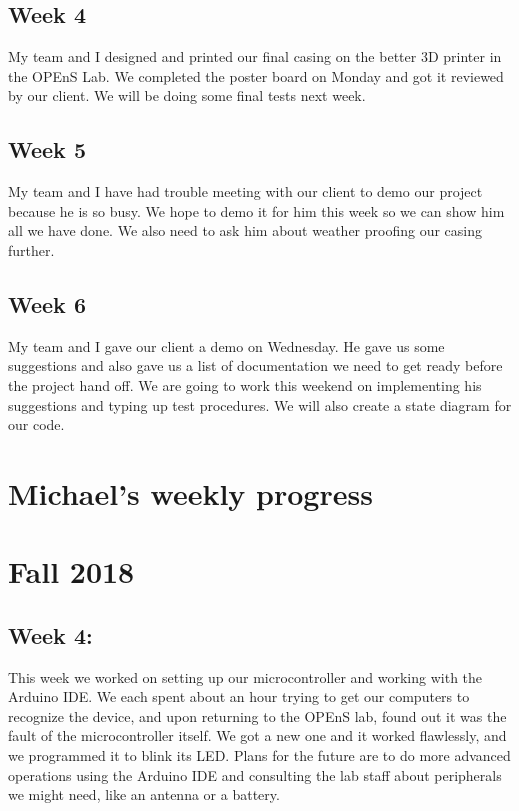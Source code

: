 \documentclass[letterpaper,10pt,draftclsnofoot,onecolumn]{article}
\begin{document}
\subsection{Week 4}

My team and I designed and printed our final casing on the better 3D printer in the OPEnS Lab. We completed the poster board on Monday and got it reviewed by our client. We will be doing some final tests next week. 

\subsection{Week 5}

My team and I have had trouble meeting with our client to demo our project because he is so busy. We hope to demo it for him this week so we can show him all we have done. We also need to ask him about weather proofing our casing further.

\subsection{Week 6}

My team and I gave our client a demo on Wednesday. He gave us some suggestions and also gave us a list of documentation we need to get ready before the project hand off. We are going to work this weekend on implementing his suggestions and typing up test procedures. We will also create a state diagram for our code.
\pagebreak

\section{Michael’s weekly progress}

\section{Fall 2018}

\subsection{Week 4:}

This week we worked on setting up our microcontroller and working with the Arduino IDE. We each spent about an hour trying to get our computers to recognize the device, and upon returning to the OPEnS lab, found out it was the fault of the microcontroller itself. We got a new one and it worked flawlessly, and we programmed it to blink its LED.
Plans for the future are to do more advanced operations using the Arduino IDE and consulting the lab staff about peripherals we might need, like an antenna or a battery.
\end{document}
